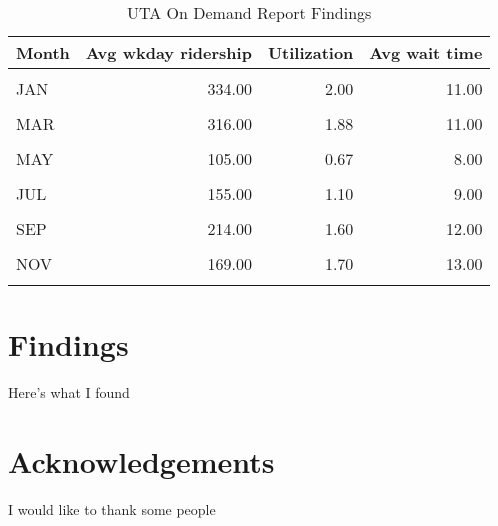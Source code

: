 \documentclass[3p, authoryear]{elsarticle} %
\begin{document}
\begin{table}[H]

\caption{\label{tab:UTAOD}UTA On Demand Report Findings}
\centering
\begin{tabular}[t]{lrrr}
\toprule
Month & Avg wkday ridership & Utilization & Avg wait time\\
\midrule
\cellcolor{gray!6}{DEC} & \cellcolor{gray!6}{224.00} & \cellcolor{gray!6}{1.33} & \cellcolor{gray!6}{9.00}\\
JAN & 334.00 & 2.00 & 11.00\\
\cellcolor{gray!6}{FEB} & \cellcolor{gray!6}{392.00} & \cellcolor{gray!6}{2.31} & \cellcolor{gray!6}{12.00}\\
MAR & 316.00 & 1.88 & 11.00\\
\cellcolor{gray!6}{APR} & \cellcolor{gray!6}{275.00} & \cellcolor{gray!6}{1.52} & \cellcolor{gray!6}{10.00}\\
MAY & 105.00 & 0.67 & 8.00\\
\cellcolor{gray!6}{JUN} & \cellcolor{gray!6}{162.00} & \cellcolor{gray!6}{1.10} & \cellcolor{gray!6}{9.00}\\
JUL & 155.00 & 1.10 & 9.00\\
\cellcolor{gray!6}{AUG} & \cellcolor{gray!6}{193.00} & \cellcolor{gray!6}{1.50} & \cellcolor{gray!6}{12.00}\\
SEP & 214.00 & 1.60 & 12.00\\
\cellcolor{gray!6}{OCT} & \cellcolor{gray!6}{200.00} & \cellcolor{gray!6}{1.70} & \cellcolor{gray!6}{13.00}\\
NOV & 169.00 & 1.70 & 13.00\\
\textbf{\cellcolor{gray!6}{Average}} & \textbf{\cellcolor{gray!6}{228.25}} & \textbf{\cellcolor{gray!6}{1.53}} & \textbf{\cellcolor{gray!6}{10.75}}\\
\bottomrule
\end{tabular}
\end{table}

\hypertarget{findings}{%
\section{Findings}\label{findings}}

Here's what I found

\hypertarget{acknowledgements}{%
\section*{Acknowledgements}\label{acknowledgements}}

I would like to thank some people


\end{document}
